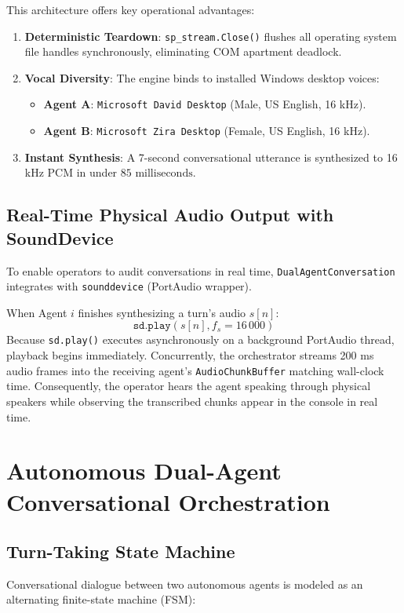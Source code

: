 \documentclass[11pt,a4paper,titlepage]{report}
\begin{document}
This architecture offers key operational advantages:
\begin{enumerate}
    \item \textbf{Deterministic Teardown}: \texttt{sp\_stream.Close()} flushes all operating system file handles synchronously, eliminating COM apartment deadlock.
    \item \textbf{Vocal Diversity}: The engine binds to installed Windows desktop voices:
    \begin{itemize}
        \item \textbf{Agent A}: \texttt{Microsoft David Desktop} (Male, US English, 16 kHz).
        \item \textbf{Agent B}: \texttt{Microsoft Zira Desktop} (Female, US English, 16 kHz).
    \end{itemize}
    \item \textbf{Instant Synthesis}: A 7-second conversational utterance is synthesized to 16 kHz PCM in under $85\text{ milliseconds}$.
\end{enumerate}

\section{Real-Time Physical Audio Output with SoundDevice}
To enable operators to audit conversations in real time, \texttt{DualAgentConversation} integrates with \texttt{sounddevice} (PortAudio wrapper).

When Agent $i$ finishes synthesizing a turn's audio $s[n]$:
\begin{equation}
    \texttt{sd.play}(s[n], f_s = 16\,000)
\end{equation}
Because \texttt{sd.play()} executes asynchronously on a background PortAudio thread, playback begins immediately. Concurrently, the orchestrator streams 200 ms audio frames into the receiving agent's \texttt{AudioChunkBuffer} matching wall-clock time. Consequently, the operator hears the agent speaking through physical speakers while observing the transcribed chunks appear in the console in real time.

\newpage

\chapter{Autonomous Dual-Agent Conversational Orchestration}

\section{Turn-Taking State Machine}
Conversational dialogue between two autonomous agents is modeled as an alternating finite-state machine (FSM):
\end{document}
